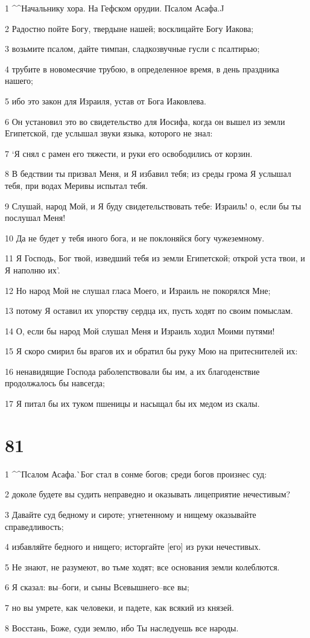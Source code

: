 \par 1 ^^Начальнику хора. На Гефском орудии. Псалом Асафа.^^
\par 2 Радостно пойте Богу, твердыне нашей; восклицайте Богу Иакова;
\par 3 возьмите псалом, дайте тимпан, сладкозвучные гусли с псалтирью;
\par 4 трубите в новомесячие трубою, в определенное время, в день праздника нашего;
\par 5 ибо это закон для Израиля, устав от Бога Иаковлева.
\par 6 Он установил это во свидетельство для Иосифа, когда он вышел из земли Египетской, где услышал звуки языка, которого не знал:
\par 7 `Я снял с рамен его тяжести, и руки его освободились от корзин.
\par 8 В бедствии ты призвал Меня, и Я избавил тебя; из среды грома Я услышал тебя, при водах Меривы испытал тебя.
\par 9 Слушай, народ Мой, и Я буду свидетельствовать тебе: Израиль! о, если бы ты послушал Меня!
\par 10 Да не будет у тебя иного бога, и не поклоняйся богу чужеземному.
\par 11 Я Господь, Бог твой, изведший тебя из земли Египетской; открой уста твои, и Я наполню их'.
\par 12 Но народ Мой не слушал гласа Моего, и Израиль не покорялся Мне;
\par 13 потому Я оставил их упорству сердца их, пусть ходят по своим помыслам.
\par 14 О, если бы народ Мой слушал Меня и Израиль ходил Моими путями!
\par 15 Я скоро смирил бы врагов их и обратил бы руку Мою на притеснителей их:
\par 16 ненавидящие Господа раболепствовали бы им, а их благоденствие продолжалось бы навсегда;
\par 17 Я питал бы их туком пшеницы и насыщал бы их медом из скалы.

\chapter{81}

\par 1 ^^Псалом Асафа.^^ Бог стал в сонме богов; среди богов произнес суд:
\par 2 доколе будете вы судить неправедно и оказывать лицеприятие нечестивым?
\par 3 Давайте суд бедному и сироте; угнетенному и нищему оказывайте справедливость;
\par 4 избавляйте бедного и нищего; исторгайте [его] из руки нечестивых.
\par 5 Не знают, не разумеют, во тьме ходят; все основания земли колеблются.
\par 6 Я сказал: вы--боги, и сыны Всевышнего--все вы;
\par 7 но вы умрете, как человеки, и падете, как всякий из князей.
\par 8 Восстань, Боже, суди землю, ибо Ты наследуешь все народы.

